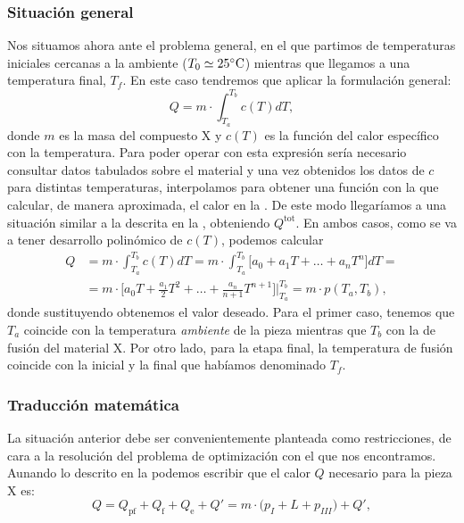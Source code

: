 \subsubsection{Situación general} \label{SituacionGeneral}
%
%
%
Nos situamos ahora ante el problema general, en el que partimos de temperaturas iniciales cercanas a la ambiente ($T_0 \simeq 25 ^{\circ} \text{C}$) mientras que llegamos a una temperatura final, $T_f$. En este caso tendremos que aplicar la formulación general:
\begin{equation}
    Q = m \cdot \int_{T_a}^{T_b} c(T)dT,
    \label{calor}
\end{equation}
donde $m$ es la masa del compuesto X y $c(T)$ es la función del calor específico con la temperatura. Para poder operar con esta expresión sería necesario consultar datos tabulados sobre el material y una vez obtenidos los datos de $c$ para distintas temperaturas, interpolamos para obtener una función con la que calcular, de manera aproximada, el calor en la .
De este modo llegaríamos a una situación similar a la descrita en la , obteniendo $Q^{\text{tot}}$. En ambos casos, como se va a tener desarrollo polinómico de $c(T)$, podemos calcular
\begin{align}
    Q & = m \cdot \int_{T_a}^{T_b} c(T)dT = m \cdot \int_{T_a}^{T_b} \Big[a_0+ a_1 T + \dots + a_nT^n \Big]dT = \\
    & = m \cdot \Big[a_0T+ \frac{a_1}{2} T^2 + \dots + \frac{a_n}{n+1} T^{n+1}\Big] \bigg|_{T_a}^{T_b} = m \cdot p(T_a, T_b),
\end{align}
donde sustituyendo obtenemos el valor deseado. Para el primer caso, tenemos que $T_a$ coincide con la temperatura \textit{ambiente} de la pieza mientras que $T_b$ con la de fusión del material X. Por otro lado, para la etapa final, la temperatura de fusión coincide con la inicial y la final que habíamos denominado $T_f$.
\subsubsection{Traducción matemática}
La situación anterior debe ser convenientemente planteada como restricciones, de cara a la resolución del problema de optimización con el que nos encontramos. Aunando lo descrito en la  podemos escribir que el calor $Q$ necesario para la pieza X es:
\begin{equation}
    Q = Q_{\text{pf}} + Q_{\text{f}} + Q_{\text{e}} + Q' = m \cdot \Big( p_I + L + p_{III} \Big) + Q',
\end{equation}

